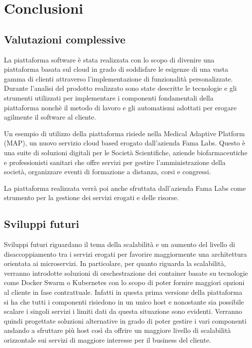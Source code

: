\chapter{Conclusioni}
\section{Valutazioni complessive}
La piattaforma software è stata realizzata con lo scopo di divenire una piattaforma basata sul cloud
in grado di soddisfare le esigenze di una vasta gamma di clienti attraverso l'implementazione
di funzionalità personalizzate. Durante l'analisi del prodotto realizzato sono state descritte le tecnologie
e gli strumenti utilizzati per implementare i componenti fondamentali della piattaforma nonchè
il metodo di lavoro e gli automatismi adottati per erogare agilmente il software al cliente.

Un esempio di utilizzo della piattaforma risiede nella Medical Adaptive Platform (MAP), un nuovo servizio
cloud based erogato dall'azienda Fama Labs. Questo è una suite di soluzioni digitali per le Società Scientifiche,
aziende biofarmaceutiche e professionisti sanitari che offre servizi per gestire l'amministrazione della società,
organizzare eventi di formazione a distanza, corsi e congressi.

La piattaforma realizzata verrà poi anche sfruttata dall'azienda Fama Labs come strumento per la gestione
dei servizi erogati e delle risorse.


\section{Sviluppi futuri}
Sviluppi futuri riguardano il tema della scalabilità e un aumento del livello di disaccoppiamento tra i servizi erogati
per favorire maggiormente una architettura orientata ai microservizi.
In particolare, per quanto riguarda la scalabilità, verranno introdotte soluzioni di orschestrazione
dei container basate su tecnologie come Docker Swarm o Kubernetes con lo scopo di poter fornire maggiori opzioni al
cliente in fase contrattuale. Infatti in questa prima versione della piattaforma si ha che tutti i componenti risiedono in un unico host
e nonostante sia possibile scalare i singoli servizi i limiti dati da questa situazione sono evidenti.
Verranno quindi progettate soluzioni alternative in grado di poter gestire i vari componenti andando a sfruttare più host
così da offrire un maggiore livello di scalabilità orizzontale sui servizi di maggiore interesse per il business del cliente.
